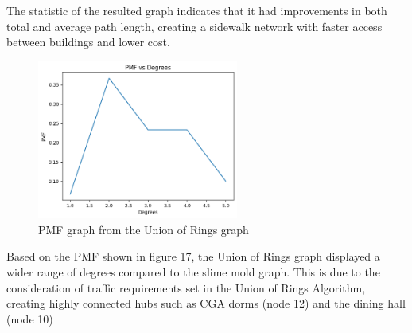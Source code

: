 \documentclass[11pt]{article}
\begin{document}
The statistic of the resulted graph indicates that it had improvements in both total and average path length, creating a sidewalk network with faster access between buildings and lower cost. 
\begin{figure}[H]
\centering
\includegraphics[width=250px]{pmfuor.png}
\caption{PMF graph from the Union of Rings graph}
\end{figure}
\par Based on the PMF shown in figure 17, the Union of Rings graph displayed a wider range of degrees compared to the slime mold graph. This is due to the consideration of traffic requirements set in the Union of Rings Algorithm, creating highly connected hubs such as CGA dorms (node 12) and the dining hall (node 10)
\end{document}
